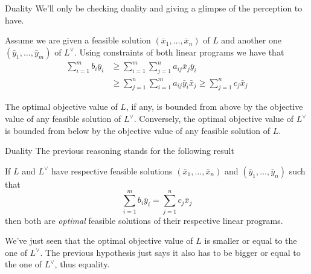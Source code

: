 \documentclass[32pt, aspectratio = 169]{beamer}
\begin{document}
\begin{frame}{Duality}
    We'll only be checking duality and giving a glimpse of the perception to have.

    Assume we are given a feasible solution $(\bar{x}_1, \ldots, \bar{x}_n)$ of $L$ and another one $(\bar{y}_1, \ldots, \bar{y}_m)$ of $L^\vee$. Using constraints of both linear programs we have that
    \begin{align}
    \sum_{i=1}^m b_i\bar{y}_i & \geq \sum_{i=1}^m \sum_{j=1}^n a_{ij}\bar{x}_j\bar{y}_i \\
        & \geq \sum_{j=1}^n \sum_{i=1}^m a_{ij}\bar{y}_i\bar{x}_j \geq \sum_{j=1}^n c_j\bar{x}_j
\end{align}
    \begin{tcolorbox}[
        enhanced,
        parbox = false,
        colback = mLightBrown!30!white,
        colframe = mLightBrown!30!white,
        arc = 0mm,
        ]
        The optimal objective value of $L$, if any, is bounded from above by the objective value of any feasible solution of $L^\vee$. Conversely, the optimal objective value of $L^\vee$ is bounded from below by the objective value of any feasible solution of $L$.
    \end{tcolorbox}
\end{frame}

\begin{frame}{Duality}
    The previous reasoning stands for the following result
    \begin{lem}
        If $L$ and $L^\vee$ have respective feasible solutions $(\bar{x}_1, \ldots, \bar{x}_n)$ and $(\bar{y}_1, \ldots, \bar{y}_n)$ such that
        \[
        \sum_{i=1}^m b_i\bar{y}_i = \sum_{j=1}^nc_j\bar{x}_j
        \]
        then both are \emph{optimal} feasible solutions of their respective linear programs.
    \end{lem}
    \begin{demo}
        We've just seen that the optimal objective value of $L$ is smaller or equal to the one of $L^\vee$. The previous hypothesis just says it also has to be bigger or equal to the one of $L^\vee$, thus equality.
    \end{demo}
\end{frame}
\end{document}
